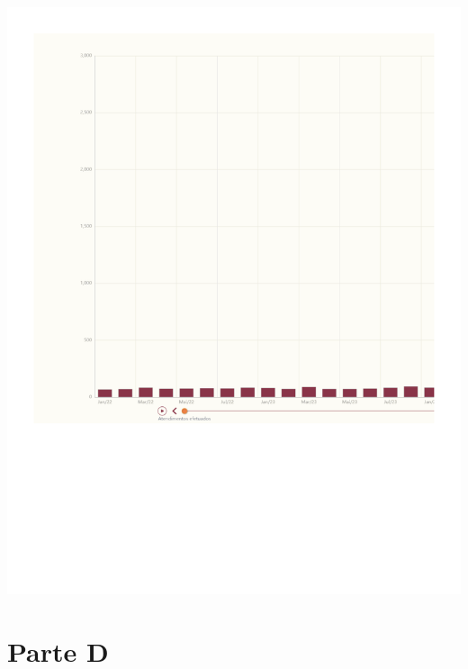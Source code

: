 \documentclass[
  letterpaper,
  DIV=11,
  numbers=noendperiod]{scrreprt}
\begin{document}
\includegraphics{intro_files/figure-pdf/unnamed-chunk-4-1.pdf}

\section{Parte D}
\end{document}
